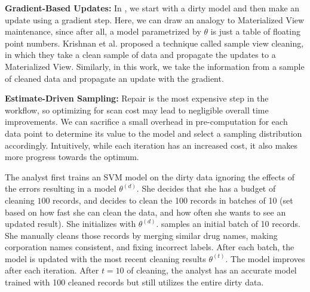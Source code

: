   \vspace{0.5em}

  \noindent\textbf{Gradient-Based Updates: } In \sys, we start with a dirty model and then make an update using a gradient step. Here, we can draw an analogy to Materialized View maintenance, since after all, a model parametrized by $\theta$ is just a table of floating point numbers.
  Krishnan et al. proposed a technique called sample view cleaning, in which they take a clean sample of data and propagate the updates to a Materialized View.
  Similarly, in this work, we take the information from a sample of cleaned data and propagate an update with the gradient.

  \vspace{0.5em}

  \noindent\textbf{Estimate-Driven Sampling: } Repair is the most expensive step in the workflow, so optimizing for scan cost may lead to negligible overall time improvements.
  We can sacrifice a small overhead in pre-computation for each data point to determine its value to the model and select a sampling distribution accordingly.
  Intuitively, while each iteration has an increased cost, it also makes more progress towards the optimum.


  \begin{example}

  The analyst first trains an SVM model on the dirty data ignoring the effects of the errors resulting in a model $\theta^{(d)}$.
  She decides that she has a budget of cleaning $100$ records, and decides to clean the 100 records in batches of 10 (set based on how fast she can clean the data, and how often she wants to see an updated result).
  She initializes \sys with $\theta^{(d)}$.
  \sys samples an initial batch of 10 records.
  She manually cleans those records by merging similar drug names, making corporation names consistent, and fixing incorrect labels.
  After each batch, the model is updated with the most recent cleaning results $\theta^{(t)}$.
  The model improves after each iteration.
  After $t=10$ of cleaning, the analyst has an accurate model trained with 100 cleaned records but still utilizes the entire dirty data.
  \end{example}
\fi


